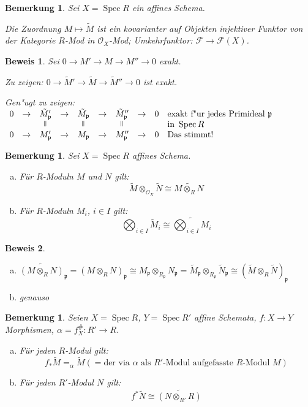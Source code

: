 \documentclass[paper = A4, fontsize=12pt, numbers=noendperiod, chapterprefix=true]{scrbook}
\theoremstyle{break}
\newtheorem{Bem}[Def]{Bemerkung}
\theoremstyle{nonumberbreak}
\newtheorem{bew}{Beweis}
\theoremstyle{nonumberplain}
\newcommand{\verteq}{\rotatebox{90}{$=$}}
\DeclareMathOperator{\Spec}{Spec}
\newcommand{\calF}{\mathcal{F}}
\newcommand{\calO}{\mathcal{O}}
\newcommand{\p}{\mathfrak{p}} %
\begin{document}
\begin{Bem}
Sei $X = \Spec R$ ein affines Schema.

Die Zuordnung $M \mapsto \tilde M$ ist ein kovarianter auf Objekten injektiver Funktor von der Kategorie $R$-Mod in $\calO_X$-Mod; Umkehrfunktor: $\calF \to \calF(X)$.
\end{Bem}

\begin{bew}
Sei $0 \to M' \to M \to M'' \to 0$ exakt.

\emph{Zu zeigen}: $0 \to \tilde M' \to \tilde M \to \tilde M'' \to 0$ ist exakt.

\emph{Gen"ugt zu zeigen}: $\begin{array}{cccccccccl} 0 &\to& \tilde M_\p' &\to& \tilde M_\p &\to& \tilde M_\p'' &\to& 0 & \text{exakt f"ur jedes Primideal } \p\\
	&&\verteq&&\verteq&&\verteq&&&\text{in } \Spec R \\
	0 &\to& M_\p' &\to& M_\p &\to& M_\p'' &\to& 0 & \text{Das stimmt!}\end{array}$
\end{bew}

\begin{Bem}
Sei $X = \Spec R$ affines Schema.
\begin{enumerate}[a)]
\item
	F\"ur $R$-Moduln $M$ und $N$ gilt:
		\[\tilde M \otimes_{\calO_X} \tilde N \cong \widetilde{M \otimes_R N}\]
\item
	F\"ur $R$-Moduln $M_i$, $i \in I$ gilt:
		\[ \bigotimes_{i\in I} \tilde M_i \cong \widetilde{\bigotimes_{i \in I} M_i} \]
\end{enumerate}\end{Bem}

\begin{bew}\begin{enumerate}[a)]
\item
	$\widetilde{(M \otimes_R N)}_\p = (M \otimes_R N)_\p \cong M_\p \otimes_{R_\p} N_\p = \tilde M_\p \otimes_{R_\p} \tilde N_\p \cong (\tilde M \otimes_R \tilde N)_\p$
\item
	genauso
\end{enumerate}\end{bew}

\begin{Bem}\label{9.7}
Seien $X= \Spec R$, $Y = \Spec R'$ affine Schemata, $f: X \to Y$ Morphismen, $\alpha = f_X^\#: R' \to R$.
\begin{enumerate}[a)]
\item
	F\"ur jeden $R$-Modul gilt:
		\[ f_*\tilde M = _\alpha\tilde M (= \text{der via } \alpha \text{ als } R' \text{-Modul aufgefasste } R \text{-Modul } M) \]
\item\label{9.7b}
	F\"ur jeden $R'$-Modul $N$ gilt:
		\[ f^*\tilde N \cong \widetilde{(N \otimes_{R'} R)} \]
\end{enumerate}\end{Bem}
\end{document}
